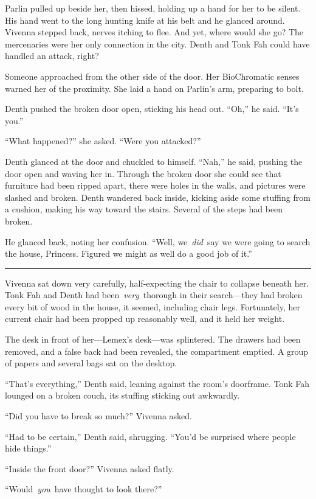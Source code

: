 Parlin pulled up beside her, then hissed, holding up a hand for her to be silent. His hand went to the long hunting knife at his belt and he glanced around. Vivenna stepped back, nerves itching to flee. And yet, where would she go? The mercenaries were her only connection in the city. Denth and Tonk Fah could have handled an attack, right?

Someone approached from the other side of the door. Her BioChromatic senses warned her of the proximity. She laid a hand on Parlin’s arm, preparing to bolt.

Denth pushed the broken door open, sticking his head out. “Oh,” he said. “It’s you.”

“What happened?” she asked. “Were you attacked?”

Denth glanced at the door and chuckled to himself. “Nah,” he said, pushing the door open and waving her in. Through the broken door she could see that furniture had been ripped apart, there were holes in the walls, and pictures were slashed and broken. Denth wandered back inside, kicking aside some stuffing from a cushion, making his way toward the stairs. Several of the steps had been broken.

He glanced back, noting her confusion. “Well, we~\textit{did}~say we were going to search the house, Princess. Figured we might as well do a good job of it.”

\bigskip \hrule \bigskip

Vivenna sat down very carefully, half-expecting the chair to collapse beneath her. Tonk Fah and Denth had been~\textit{very}~thorough in their search—they had broken every bit of wood in the house, it seemed, including chair legs. Fortunately, her current chair had been propped up reasonably well, and it held her weight.

The desk in front of her—Lemex’s desk—was splintered. The drawers had been removed, and a false back had been revealed, the compartment emptied. A group of papers and several bags sat on the desktop.

“That’s everything,” Denth said, leaning against the room’s doorframe. Tonk Fah lounged on a broken couch, its stuffing sticking out awkwardly.

“Did you have to break so much?” Vivenna asked.

“Had to be certain,” Denth said, shrugging. “You’d be surprised where people hide things.”

“Inside the front door?” Vivenna asked flatly.

“Would~\textit{you}~have thought to look there?”

